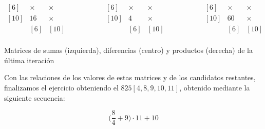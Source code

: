 \begin{center}
$\begin{matrix}
[6]  & \times & \times \\
[10] & 16     & \times \\
     &   [6]  &  [10]  \\
\end{matrix}
\ \ \ \ \ \ \ \ \ \ \ \ \ \ \ \ \ \ \ \ \ \ \begin{matrix}
[6]  & \times & \times \\
[10] & 4      & \times \\
     &   [6]  &  [10]  \\
\end{matrix}
\ \ \ \ \ \ \ \ \ \ \ \ \ \ \ \ \ \ \ \ \ \ \begin{matrix}
[6]  & \times & \times \\
[10] & 60     & \times \\
     &   [6]  &  [10]  \\
\end{matrix}$

Matrices de sumas (izquierda), diferencias (centro) y productos (derecha) de la última iteración
\end{center}

Con las relaciones de los valores de estas matrices y de los candidatos restantes, finalizamos el ejercicio obteniendo el  $825[4,8,9,10,11]$, obtenido mediante la siguiente secuencia:

\begin{center}
\[\bigg(\frac{8}{4}+9\bigg)\cdot11+10\]
\end{center}

